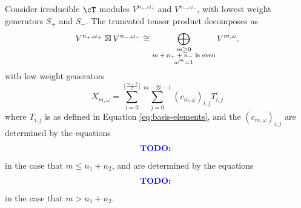 \documentclass{article}
\begin{document}
\begin{thm}
Consider irreducible $\cT$ modules $V^{n_+, \omega_+}$ and $V^{n_-, \omega_-}$, with lowest weight generators $S_+$ and $S_-$.
The truncated tensor product decomposes as
$$
V^{n_+, \omega_+} \boxtimes V^{n_-, \omega_-} 
\cong 
\bigoplus_{\substack{m \geq 0 \\ \text{$m + n_+  + n_-$ is even} \\ \omega^m = 1}} V^{m, \omega},
$$
with low weight generators 
$$
X_{m, \omega} 
= 
\sum_{i=0}^{\lfloor\frac{m-2}{2}\rfloor}
\sum_{j=0}^{m- 2i - 1} 
(c_{m,\omega})_{i,j} T_{i,j}
$$
where $T_{i,j}$ is as defined in Equation \eqref{eq:basis-elements}, and the $(c_{m,\omega})_{i,j}$ are determined by the equations
\begin{align*}
\textcolor{blue}{\textbf{TODO: }}
\end{align*}
in the case that $m \leq n_1 + n_2$, and are determined by the equations
\begin{align*}
\textcolor{blue}{\textbf{TODO: }}
\end{align*}
in the case that $m > n_1 + n_2$.
\end{thm}
\end{document}
